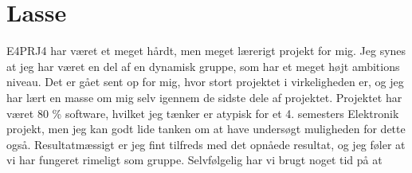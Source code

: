 \section{Lasse} 

E4PRJ4 har været et meget hårdt, men meget lærerigt projekt for mig. Jeg synes at jeg har været en del af en dynamisk gruppe, som har et meget højt ambitions niveau. Det er gået sent op for mig, hvor stort projektet i virkeligheden er, og jeg har lært en masse om mig selv igennem de sidste dele af projektet. Projektet har været 80 \% software, hvilket jeg tænker er atypisk for et 4. semesters Elektronik projekt, men jeg kan godt lide tanken om at have undersøgt muligheden for dette også. Resultatmæssigt er jeg fint tilfreds med det opnåede resultat, og jeg føler at vi har fungeret rimeligt som gruppe. Selvfølgelig har vi brugt noget tid på at 
